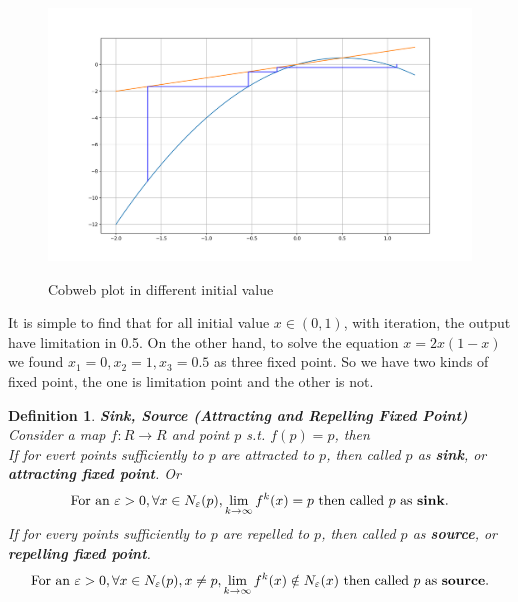 \documentclass[12pt]{article}
\theoremstyle{plain}
\newtheorem{definition}{{\color{red}\textbf{Definition}}}[section]
\begin{document}
\begin{figure}[H]
\begin{minipage}[c][0.6\width]{
   0.5\textwidth}
\end{minipage}
\begin{minipage}[c][0.6\width]{
   0.5\textwidth}
   \centering
   \includegraphics[width=1\textwidth]{figure/section1/cb04.png} \\
\end{minipage}
\caption{Cobweb plot in different initial value}\label{logistic-cobweb-plot}
\end{figure}


It is simple to find that for all initial value $x \in (0, 1)$, with iteration, the output have limitation in 0.5. On the other hand, to solve the equation $x = 2x(1-x)$ we found $x_1 = 0, x_2 = 1, x_3 = 0.5$ as three fixed point. So we have two kinds of fixed point, the one is limitation point and the other is not.


\begin{definition}\textbf{Sink, Source (Attracting and Repelling Fixed Point)}
\\\noindent Consider a map $f: R \rightarrow R$ and point $p$ s.t. $f(p) = p$, then
\\\noindent If for evert points sufficiently to $p$ are attracted to $p$, then called $p$ as \textbf{sink}, or \textbf{attracting fixed point}. Or
$$
\text{For an } \varepsilon > 0, \forall x \in N_\varepsilon(p), \lim_{k \rightarrow \infty}f^k(x) = p \text{ then called } p \text{ as \textbf{sink}}.
$$
If for every points sufficiently to $p$ are repelled to $p$, then called $p$ as \textbf{source}, or \textbf{repelling fixed point}.
$$
\text{For an } \varepsilon > 0, \forall x \in N_\varepsilon(p), x \neq p, \lim_{k \rightarrow \infty}f^k(x) \notin N_\varepsilon(x) \text{ then called } p \text{ as \textbf{source}}.
$$
\end{definition}
\end{document}
